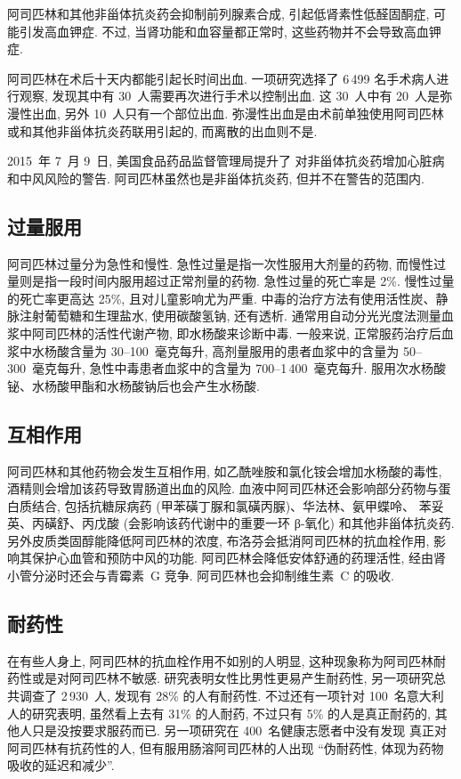 阿司匹林和其他非甾体抗炎药会抑制前列腺素合成,
引起低肾素性低醛固酮症, 可能引发高血钾症.
不过, 当肾功能和血容量都正常时,
这些药物并不会导致高血钾症.

阿司匹林在术后十天内都能引起长时间出血.
一项研究选择了 6\,499 名手术病人进行观察,
发现其中有 30~人需要再次进行手术以控制出血.
这 30~人中有 20~人是弥漫性出血, 另外 10~人只有一个部位出血.
弥漫性出血是由术前单独使用阿司匹林或和其他非甾体抗炎药联用引起的,
而离散的出血则不是.

2015~年 7~月 9~日,
美国食品药品监督管理局提升了%
对非甾体抗炎药增加心脏病和中风风险的警告.
阿司匹林虽然也是非甾体抗炎药, 但并不在警告的范围内.

\subsection{过量服用}

阿司匹林过量分为急性和慢性.
急性过量是指一次性服用大剂量的药物,
而慢性过量则是指一段时间内服用超过正常剂量的药物.
急性过量的死亡率是 2\%.
慢性过量的死亡率更高达 25\%, 且对儿童影响尤为严重.
中毒的治疗方法有使用活性炭、静脉注射葡萄糖和生理盐水,
使用碳酸氢钠, 还有透析.
通常用自动分光光度法测量血浆中阿司匹林的活性代谢产物,
即水杨酸来诊断中毒.
一般来说, 正常服药治疗后血浆中水杨酸含量为 30--100~毫克每升,
高剂量服用的患者血浆中的含量为 50--300~毫克每升,
急性中毒患者血浆中的含量为 700--1\,400~毫克每升.
服用次水杨酸铋、水杨酸甲酯和水杨酸钠后也会产生水杨酸.

\subsection{互相作用}

阿司匹林和其他药物会发生互相作用,
如乙酰唑胺和氯化铵会增加水杨酸的毒性,
酒精则会增加该药导致胃肠道出血的风险.
血液中阿司匹林还会影响部分药物与蛋白质结合,
包括抗糖尿病药 (甲苯磺丁脲和氯磺丙脲)、华法林、氨甲蝶呤、%
苯妥英、丙磺舒、丙戊酸 (会影响该药代谢中的重要一环 β-氧化)
和其他非甾体抗炎药.
另外皮质类固醇能降低阿司匹林的浓度,
布洛芬会抵消阿司匹林的抗血栓作用,
影响其保护心血管和预防中风的功能.
阿司匹林会降低安体舒通的药理活性,
经由肾小管分泌时还会与青霉素~G 竞争.
阿司匹林也会抑制维生素~C 的吸收.

\subsection{耐药性}

在有些人身上, 阿司匹林的抗血栓作用不如别的人明显,
这种现象称为阿司匹林耐药性或是对阿司匹林不敏感.
研究表明女性比男性更易产生耐药性,
另一项研究总共调查了 2\,930~人,
发现有 28\% 的人有耐药性.
不过还有一项针对 100~名意大利人的研究表明,
虽然看上去有 31\% 的人耐药,
不过只有 5\% 的人是真正耐药的,
其他人只是没按要求服药而已.
另一项研究在 400~名健康志愿者中没有发现%
真正对阿司匹林有抗药性的人,
但有服用肠溶阿司匹林的人出现
``伪耐药性, 体现为药物吸收的延迟和减少''.

